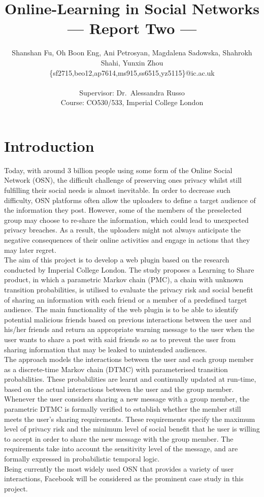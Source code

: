\documentclass[a4paper,11pt]{article}
\title{Online-Learning in Social Networks\\\Large{--- Report Two ---}}
\author{Shanshan Fu, Oh Boon Eng, Ani Petrosyan, Magdalena Sadowska,
  Shahrokh Shahi, Yunxin Zhou\\
       \{sf2715,beo12,ap7614,ms915,ss6515,yz5115\}@ic.ac.uk\\ \\
       \small{Supervisor: Dr.\ Alessandra Russo}\\
       \small{Course: CO530/533, Imperial College London}
}
\begin{document}
\maketitle

\tableofcontents
\newpage
\setcounter{page}{1}
\section {Introduction}

Today, with around 3 billion people using some form of the Online Social Network (OSN)\cite{InternetUsers}, the difficult challenge of preserving one\textquotesingle s privacy whilst still fulfilling their social needs is almost inevitable. In order to decrease such difficulty, OSN platforms often allow the uploaders to define a target audience of the information they post. However, some of the members of the preselected group may choose to re-share the information, which could lead to unexpected privacy breaches\cite{PrivacyBreaches}. As a result, the uploaders might not always anticipate the negative consequences of their online activities and engage in actions that they may later regret\cite{FacebookRegret, ShareRegret}.\\
\indent The aim of this project is to develop a web plugin based on the research conducted by Imperial College London. The study proposes a Learning to Share product, in which a parametric Markov chain (PMC), a chain with unknown transition probabilities, is utilised to evaluate the privacy risk and social benefit of sharing an information with each friend or a member of a predefined target audience. The main functionality of the web plugin is to be able to identify potential malicious friends based on previous interactions between the user and his/her friends and return an appropriate warning message to the user when the user wants to share a post with said friends so as to prevent the user from sharing information that may be leaked to unintended audiences.\\
\indent The approach models the interactions  between  the  user  and  each  group  member  as a discrete-time Markov chain (DTMC) with parameterised transition probabilities.  These probabilities are learnt and continually updated at run-time, based on the actual interactions between the user and the group member.  Whenever the user considers sharing a new message with a group member, the parametric DTMC is formally verified to establish whether the member still meets the user's sharing requirements. These requirements specify the maximum level of privacy risk and the minimum level of social benefit that he user is willing to accept in order to share the new message with the group member. The requirements take into account the sensitivity level of the message, and are formally expressed in probabilistic temporal logic.\\
\indent Being currently the most widely used OSN that provides a variety of user interactions\cite{RankSN, Interactions}, Facebook will be considered as the prominent case study in this project.\\
 
\end{document}
